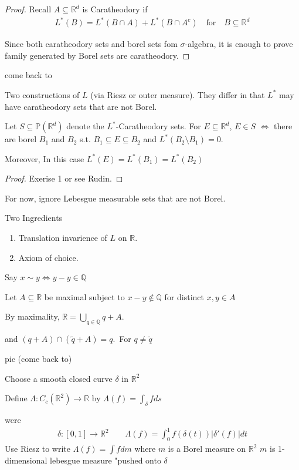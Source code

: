 \begin{proof}
	Recall $A \subseteq \mathbb{R}^d$ is Caratheodory if
	\begin{align*}
	L^*(B) = L^*(B \cap A ) + L^*(B \cap A^{c}) \quad \text{for} \quad B \subseteq \mathbb{R}^d
	\end{align*} 

	Since both caratheodory sets and borel sets fom $\sigma$-algebra, it is enough to prove family generated by Borel sets are caratheodory.


\end{proof}

come back to

	Two constructions of $L$ (via Riesz or outer measure). They differ in that $L^*$ may have caratheodory sets that are not Borel.

\begin{theorem}
	Let $S \subseteq \mathbb{P}(\mathbb{R}^d)$ denote the $L^*$-Caratheodory sets. For $E \subseteq 
	\mathbb{R}^d$, $E \in S$ $\iff$ there are borel $B_1$ and $B_2$ s.t. $B_1 \subseteq E \subseteq B_2$ and
	$L^*(B_2 \setminus B_1) = 0$.

	Moreover, In this case  $L^*(E) = L^*(B_1) = L^*(B_2)$
\end{theorem}
\begin{proof}
	Exerise 1 or see Rudin.
\end{proof}

For now, ignore Lebesgue measurable sets that are not Borel.

\begin{example}
	Two Ingredients
	\begin{enumerate}
		\item Translation invarience of $L$ on $\mathbb{R}$.
		\item Axiom of choice.
	\end{enumerate}

	Say $x \sim y \iff y - y \in  \mathbb{Q}$

	Let $A \subseteq \mathbb{R}$ be maximal subject to $x - y \notin \mathbb{Q}$ for distinct $x,y \in A$

	By maximality,  $\mathbb{R} = \bigcup_{q \in \mathbb{Q}} q + A$.

	and $(q + A) \cap (\tilde{q} + A) = q$.\,  For $q \neq \tilde{q}$
\end{example}
pic (come back to)

\begin{definition}
	Choose a smooth closed curve $\delta$ in $\mathbb{R}^2$

	Define $\Lambda : C_c(\mathbb{R}^2) \to \mathbb{R}$ by $\Lambda (f) = \int_{\delta} f ds$

	were 
	\begin{align*}
		\delta :[0,1] \to \mathbb{R}^2 \qquad \Lambda (f) = \int_{0}^{1} f(\delta(t)) |\delta'(f) |dt
	\end{align*} 
	Use Riesz to write $\Lambda (f) = \int f dm$  where $m$ is a Borel measure on $\mathbb{R}^2$
	$m$ is 1-dimensional lebesgue measure "pushed onto $\delta$
\end{definition}

